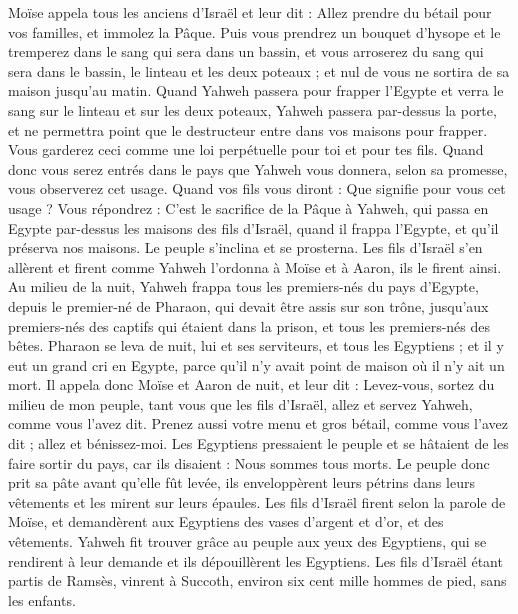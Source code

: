 \begin{multicols}{2}
Moïse appela tous les anciens d'Israël et leur dit : Allez prendre du bétail pour vos familles, et immolez la Pâque.
Puis vous prendrez un bouquet d'hysope et le tremperez dans le sang qui sera dans un bassin, et vous arroserez du sang qui sera dans le bassin, le linteau et les deux poteaux ; et nul de vous ne sortira de sa maison jusqu'au matin.
Quand Yahweh passera pour frapper l'Egypte et verra le sang sur le linteau et sur les deux poteaux, Yahweh passera par-dessus la porte, et ne permettra point que le destructeur entre dans vos maisons pour frapper.
Vous garderez ceci comme une loi perpétuelle pour toi et pour tes fils.
Quand donc vous serez entrés dans le pays que Yahweh vous donnera, selon sa promesse, vous observerez cet usage.
Quand vos fils vous diront : Que signifie pour vous cet usage ?
Vous répondrez : C'est le sacrifice de la Pâque à Yahweh, qui passa en Egypte par-dessus les maisons des fils d'Israël, quand il frappa l'Egypte, et qu'il préserva nos maisons. Le peuple s'inclina et se prosterna.
Les fils d'Israël s'en allèrent et firent comme Yahweh l’ordonna à Moïse et à Aaron, ils le firent ainsi.
Au milieu de la nuit, Yahweh frappa tous les premiers-nés du pays d'Egypte, depuis le premier-né de Pharaon, qui devait être assis sur son trône, jusqu'aux premiers-nés des captifs qui étaient dans la prison, et tous les premiers-nés des bêtes.
Pharaon se leva de nuit, lui et ses serviteurs, et tous les Egyptiens ; et il y eut un grand cri en Egypte, parce qu'il n'y avait point de maison où il n'y ait un mort.
Il appela donc Moïse et Aaron de nuit, et leur dit : Levez-vous, sortez du milieu de mon peuple, tant vous que les fils d'Israël, allez et servez Yahweh, comme vous l’avez dit.
Prenez aussi votre menu et gros bétail, comme vous l’avez dit ; allez et bénissez-moi.
Les Egyptiens pressaient le peuple et se hâtaient de les faire sortir du pays, car ils disaient : Nous sommes tous morts.
Le peuple donc prit sa pâte avant qu'elle fût levée, ils enveloppèrent leurs pétrins dans leurs vêtements et les mirent sur leurs épaules.
Les fils d'Israël firent selon la parole de Moïse, et demandèrent aux Egyptiens des vases d'argent et d'or, et des vêtements.
Yahweh fit trouver grâce au peuple aux yeux des Egyptiens, qui se rendirent à leur demande et ils dépouillèrent les Egyptiens.
Les fils d'Israël étant partis de Ramsès, vinrent à Succoth, environ six cent mille hommes de pied, sans les enfants.

\end{multicols}

